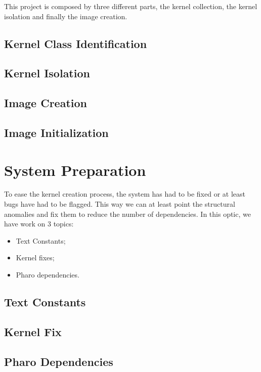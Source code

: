 \documentclass{book}
\begin{document}
This project is composed by three different parts, the kernel collection, the kernel isolation and finally the image creation.

	\section{Kernel Class Identification}
	\section{Kernel Isolation}\label{KernelIsolation}
	\section{Image Creation}
	\section{Image Initialization}




\chapter{System Preparation}
To ease the kernel creation process, the system has had to be fixed or at least bugs have had to be flagged. This way we can at least point the structural anomalies and fix them to reduce the number of dependencies. In this optic, we have work on 3 topics:
\begin{itemize}
	\item Text Constants;
	\item Kernel fixes;
	\item Pharo dependencies.
\end{itemize}

	\section{Text Constants}\label{TextConstants}
	\section{Kernel Fix}\label{KernelFixes}
	\section{Pharo Dependencies}
\end{document}
